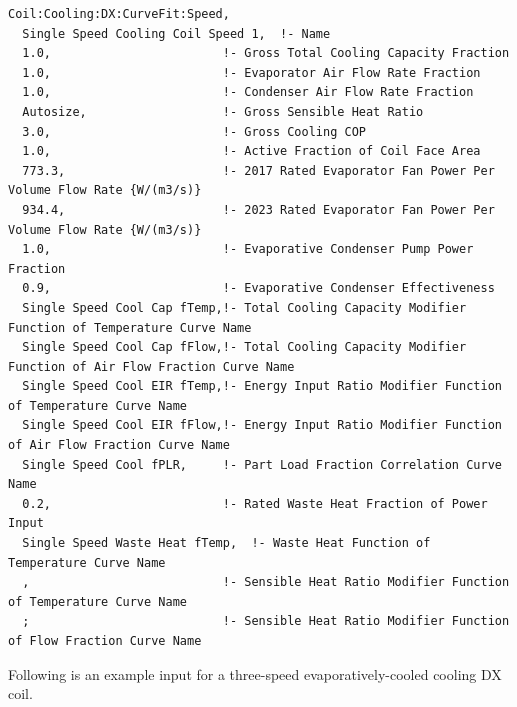 \begin{lstlisting}
Coil:Cooling:DX:CurveFit:Speed,
  Single Speed Cooling Coil Speed 1,  !- Name
  1.0,                        !- Gross Total Cooling Capacity Fraction
  1.0,                        !- Evaporator Air Flow Rate Fraction
  1.0,                        !- Condenser Air Flow Rate Fraction
  Autosize,                   !- Gross Sensible Heat Ratio
  3.0,                        !- Gross Cooling COP
  1.0,                        !- Active Fraction of Coil Face Area
  773.3,                      !- 2017 Rated Evaporator Fan Power Per Volume Flow Rate {W/(m3/s)}
  934.4,                      !- 2023 Rated Evaporator Fan Power Per Volume Flow Rate {W/(m3/s)}
  1.0,                        !- Evaporative Condenser Pump Power Fraction
  0.9,                        !- Evaporative Condenser Effectiveness
  Single Speed Cool Cap fTemp,!- Total Cooling Capacity Modifier Function of Temperature Curve Name
  Single Speed Cool Cap fFlow,!- Total Cooling Capacity Modifier Function of Air Flow Fraction Curve Name
  Single Speed Cool EIR fTemp,!- Energy Input Ratio Modifier Function of Temperature Curve Name
  Single Speed Cool EIR fFlow,!- Energy Input Ratio Modifier Function of Air Flow Fraction Curve Name
  Single Speed Cool fPLR,     !- Part Load Fraction Correlation Curve Name
  0.2,                        !- Rated Waste Heat Fraction of Power Input
  Single Speed Waste Heat fTemp,  !- Waste Heat Function of Temperature Curve Name
  ,                           !- Sensible Heat Ratio Modifier Function of Temperature Curve Name
  ;                           !- Sensible Heat Ratio Modifier Function of Flow Fraction Curve Name
\end{lstlisting}

Following is an example input for a three-speed evaporatively-cooled cooling DX coil.

